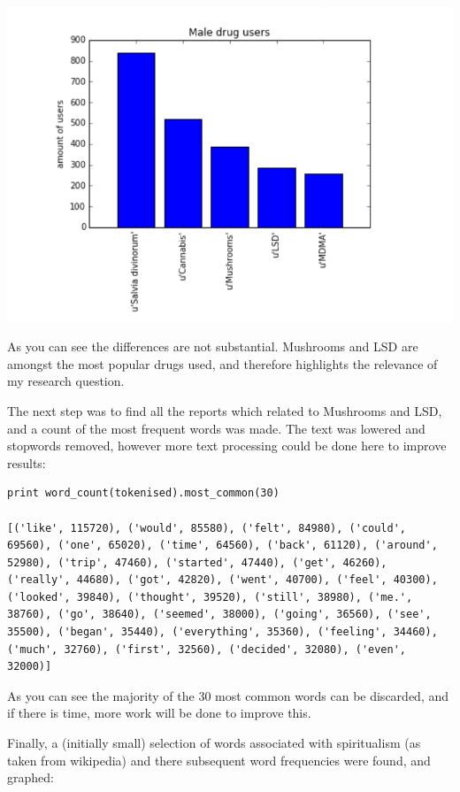 \documentclass{article}
\begin{document}
\includegraphics{graphs/top_male_drugs}

As you can see the differences are not substantial. Mushrooms and LSD are amongst the most popular drugs used, and therefore highlights the relevance of my research question. 

The next step was to find all the reports which related to Mushrooms and LSD, and a count of the most frequent words was made. The text was lowered and stopwords removed, however more text processing could be done here to improve results:

\begin{lstlisting}
print word_count(tokenised).most_common(30)

[('like', 115720), ('would', 85580), ('felt', 84980), ('could', 69560), ('one', 65020), ('time', 64560), ('back', 61120), ('around', 52980), ('trip', 47460), ('started', 47440), ('get', 46260), ('really', 44680), ('got', 42820), ('went', 40700), ('feel', 40300), ('looked', 39840), ('thought', 39520), ('still', 38980), ('me.', 38760), ('go', 38640), ('seemed', 38000), ('going', 36560), ('see', 35500), ('began', 35440), ('everything', 35360), ('feeling', 34460), ('much', 32760), ('first', 32560), ('decided', 32080), ('even', 32000)]
\end{lstlisting}

As you can see the majority of the 30 most common words can be discarded, and if there is time, more work will be done to improve this. 

Finally, a (initially small) selection of words associated with spiritualism (as taken from wikipedia) and there subsequent word frequencies were found, and graphed:
\end{document}
